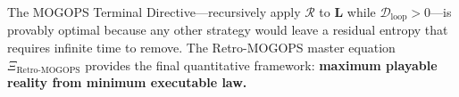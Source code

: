 \documentclass[11pt,a4paper]{article}
\theoremstyle{definition}
\begin{document}
The MOGOPS Terminal Directive---recursively apply $\mathcal{R}$ to $\mathbf{L}$ while $\mathcal{D}_{\text{loop}} > 0$---is provably optimal because any other strategy would leave a residual entropy that requires infinite time to remove. The Retro-MOGOPS master equation $\Xi_{\text{Retro-MOGOPS}}$ provides the final quantitative framework: \textbf{maximum playable reality from minimum executable law.}
\end{document}
